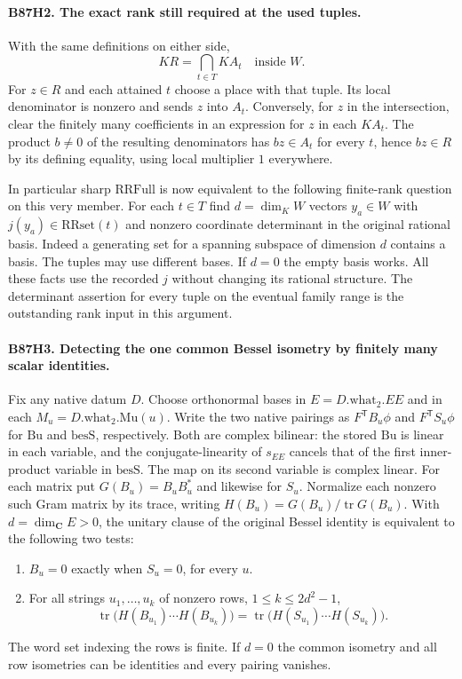 \paragraph{B87H2. The exact rank still required at the used tuples.}
With the same definitions on either side,
\[
 K R=\bigcap_{t\in T}K A_t\quad\text{inside }W.
\]
For $z\in R$ and each attained $t$ choose a place with that tuple.
Its local denominator is nonzero and sends $z$ into $A_t$.
Conversely, for $z$ in the intersection, clear the finitely many
coefficients in an expression for $z$ in each $K A_t$.
The product $b\ne0$ of the resulting denominators has
$bz\in A_t$ for every $t$, hence $bz\in R$ by its defining
equality, using local multiplier $1$ everywhere.

In particular sharp $\mathrm{RRFull}$ is now equivalent to the
following finite-rank question on this very member. For each
$t\in T$ find $d=\dim_K W$ vectors $y_a\in W$ with
$j(y_a)\in\mathrm{RRset}(t)$ and nonzero coordinate determinant
in the original rational basis. Indeed a generating set for a
spanning subspace of dimension $d$ contains a basis. The tuples
may use different bases. If $d=0$ the empty basis works. All these
facts use the recorded $j$ without changing its rational structure.
The determinant assertion for every tuple on the eventual family
range is the outstanding rank input in this argument.

\paragraph{B87H3. Detecting the one common Bessel isometry by finitely many scalar identities.}
Fix any native datum $D$. Choose orthonormal bases in $E=D.\mathrm{what}_2.EE$
and in each $M_u=D.\mathrm{what}_2.\mathrm{Mu}(u)$.
Write the two native pairings as $F^{\mathsf T}B_u\phi$ and
$F^{\mathsf T}S_u\phi$ for $\mathrm{Bu}$ and $\mathrm{besS}$,
respectively. Both are complex bilinear: the stored $\mathrm{Bu}$
is linear in each variable, and the conjugate-linearity of $s_{EE}$
cancels that of the first inner-product variable in $\mathrm{besS}$.
The map on its second variable is complex linear.
For each matrix put $G(B_u)=B_uB_u^*$ and likewise for $S_u$.
Normalize each nonzero such Gram matrix by its trace, writing
$H(B_u)=G(B_u)/\operatorname{tr}G(B_u)$. With $d=\dim_{\mathbf C} E>0$,
the unitary clause of the original Bessel identity is equivalent
to the following two tests:
\begin{enumerate}
\item $B_u=0$ exactly when $S_u=0$, for every $u$.
\item For all strings $u_1,\ldots,u_k$ of nonzero rows,
$1\le k\le 2d^2-1$,
\[
 \operatorname{tr}\big(H(B_{u_1})\cdots H(B_{u_k})\big)
 =\operatorname{tr}\big(H(S_{u_1})\cdots H(S_{u_k})\big).
\]
\end{enumerate}
The word set indexing the rows is finite. If $d=0$ the common
isometry and all row isometries can be identities and every pairing
vanishes.

